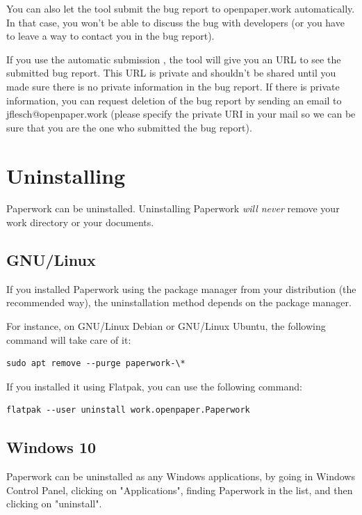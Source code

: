\documentclass[10pt,a4paper]{article}
\begin{document}
You can also let the tool submit the bug report to openpaper.work
automatically. In that case, you won't be able to discuss the bug with
developers (or you have to leave a way to contact you in the bug report).

If you use the automatic submission , the tool will give you an URL to see the
submitted bug report. This URL is private and shouldn't be shared until you
made sure there is no private information in the bug report. If there is
private information, you can request deletion of the bug report by sending an
email to jflesch@openpaper.work (please specify the private URI in your mail
so we can be sure that you are the one who submitted the bug report).


\section{Uninstalling}

Paperwork can be uninstalled. Uninstalling Paperwork \emph{will never}
remove your work directory or your documents.

\subsection{GNU/Linux}

If you installed Paperwork using the package manager from your distribution
(the recommended way), the uninstallation method depends on the package
manager.

For instance, on GNU/Linux Debian or GNU/Linux Ubuntu, the following command
will take care of it:

\begin{verbatim}
sudo apt remove --purge paperwork-\*
\end{verbatim}

If you installed it using Flatpak, you can use the following command:

\begin{verbatim}
flatpak --user uninstall work.openpaper.Paperwork
\end{verbatim}

\subsection{Windows 10}

Paperwork can be uninstalled as any Windows applications, by going in
Windows Control Panel, clicking on "Applications", finding Paperwork in the
list, and then clicking on "uninstall".
\end{document}
